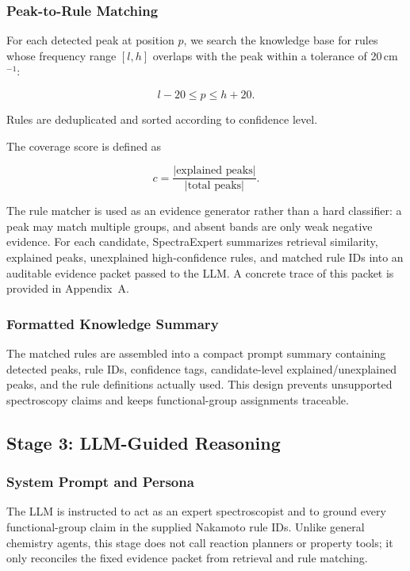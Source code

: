 \documentclass[conference]{IEEEtran}
\begin{document}
\subsubsection{Peak-to-Rule Matching}

For each detected peak at position $p$, we search the knowledge base for rules whose frequency range $[l,h]$ overlaps with the peak within a tolerance of 20\,cm$^{-1}$:

\begin{equation}
l-20 \le p \le h+20.
\end{equation}

Rules are deduplicated and sorted according to confidence level.

The coverage score is defined as

\begin{equation}
c=
\frac{
|\text{explained peaks}|
}{
|\text{total peaks}|
}.
\end{equation}

The rule matcher is used as an evidence generator rather than a hard classifier: a peak may match multiple groups, and absent bands are only weak negative evidence. For each candidate, SpectraExpert summarizes retrieval similarity, explained peaks, unexplained high-confidence rules, and matched rule IDs into an auditable evidence packet passed to the LLM. A concrete trace of this packet is provided in Appendix~A.

\subsubsection{Formatted Knowledge Summary}

The matched rules are assembled into a compact prompt summary containing detected peaks, rule IDs, confidence tags, candidate-level explained/unexplained peaks, and the rule definitions actually used. This design prevents unsupported spectroscopy claims and keeps functional-group assignments traceable.

\subsection{Stage 3: LLM-Guided Reasoning}

\subsubsection{System Prompt and Persona}

The LLM is instructed to act as an expert spectroscopist and to ground every functional-group claim in the supplied Nakamoto rule IDs. Unlike general chemistry agents, this stage does not call reaction planners or property tools; it only reconciles the fixed evidence packet from retrieval and rule matching.
\end{document}
